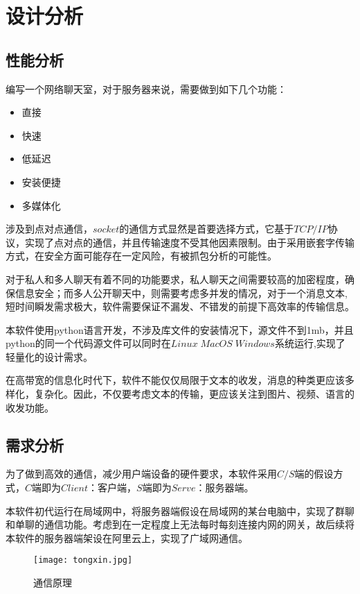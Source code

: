 \documentclass[forprint]{OSPaper}
\begin{document}
\chapter{设计分析}
\section{性能分析}

编写一个网络聊天室，对于服务器来说，需要做到如下几个功能：

\begin{itemize}
	\item 直接
	\item 快速
	\item 低延迟
	\item 安装便捷
	\item 多媒体化
\end{itemize}

涉及到点对点通信，$socket$的通信方式显然是首要选择方式，它基于$TCP/IP$协议，实现了点对点的通信，并且传输速度不受其他因素限制。由于采用嵌套字传输方式，在安全方面可能存在一定风险，有被抓包分析的可能性。

对于私人和多人聊天有着不同的功能要求，私人聊天之间需要较高的加密程度，确保信息安全；而多人公开聊天中，则需要考虑多并发的情况，对于一个消息文本,短时间瞬发需求极大，软件需要保证不漏发、不错发的前提下高效率的传输信息。

本软件使用python语言开发，不涉及库文件的安装情况下，源文件不到1mb，并且python的同一个代码源文件可以同时在$Linux \; MacOS \; Windows$系统运行,实现了轻量化的设计需求。

在高带宽的信息化时代下，软件不能仅仅局限于文本的收发，消息的种类更应该多样化，复杂化。因此，不仅要考虑文本的传输，更应该关注到图片、视频、语言的收发功能。

\section{需求分析}

为了做到高效的通信，减少用户端设备的硬件要求，本软件采用$ C/S $端的假设方式，$ C $端即为$ Client $：客户端，$ S $端即为$ Serve $：服务器端。

本软件初代运行在局域网中，将服务器端假设在局域网的某台电脑中，实现了群聊和单聊的通信功能。考虑到在一定程度上无法每时每刻连接内网的网关，故后续将本软件的服务器端架设在阿里云上，实现了广域网通信。

\begin{figure}[ht]
	\centering
	\texttt{[image: tongxin.jpg]}
	\caption{通信原理}
	\label{fig:5}
\end{figure}
\end{document}
